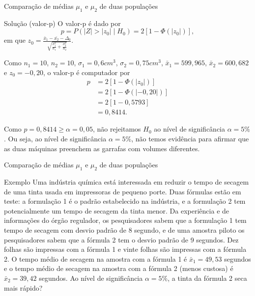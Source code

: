 \documentclass[9pt]{beamer}
\begin{document}
\begin{frame}{Comparação de médias $\mu_1$ e $\mu_2$ de duas populações}

\begin{block}{Solução (valor-p)}
	O valor-p é dado por
	$$p = P\left(\lvert Z \rvert > \lvert z_0 \rvert \mid H_0  \right) = 2 \left[ 1 - \Phi\left(\lvert z_0 \rvert\right) \right],$$
	em que $z_0 = \frac{\bar{x}_1 - \bar{x_2} - \Delta_0}{\sqrt{ \frac{\sigma_1^2}{n_1} + \frac{\sigma_2^2}{n_2} }}$.
	
	 Como $n_1=10$, $n_2=10$, $\sigma_1=0,6cm^3$, $\sigma_2=0,75cm^3$, $\bar{x}_1=599,965$, $\bar{x}_2=600,682 $ e $z_0=-0,20$, o valor-p é computador por
	 \begin{align*}
		 p &= 2 \left[1 -  \Phi\left(\lvert z_0 \rvert \right)\right]\\
		 &= 2 \left[ 1 - \Phi\left(\lvert -0,20 \rvert \right) \right]\\
		 &= 2 \left[ 1 - 0,5793 \right]\\
		 &= 0,8414.
	 \end{align*}
	 
	 Como $p=0,8414 \geq \alpha = 0,05$, não rejeitamos $H_0$ ao nível de significância $\alpha=5\%$. Ou seja, ao nível de significância $\alpha=5\%$, não temos evidência para afirmar que as duas máquinas preenchem as garrafas com volumes diferentes.
\end{block}

\end{frame}

\begin{frame}{Comparação de médias $\mu_1$ e $\mu_2$ de duas populações}

\begin{block}{Exemplo}
	Uma indústria química está interessada em reduzir o tempo de secagem de uma tinta usada em impressoras de pequeno porte. Duas fórmulas estão em teste: a formulação 1 é o padrão estabelecido na indústria, e a formulação 2 tem potencialmente um tempo de secagem da tinta menor. Da experiência e de informações do órgão regulador, os pesquisadores sabem que a formulação 1 tem tempo de secagem com desvio padrão de 8 segundo, e de uma amostra piloto os pesquisadores sabem que a fórmula 2 tem o desvio padrão de 9 segundos. Dez folhas são impressas com a fórmula 1 e vinte folhas são impressas com a fórmula 2. O tempo médio de secagem na amostra com a fórmula 1 é $\bar{x}_1 = 49,53$ segundos e o tempo médio de secagem na amostra com a fórmula 2 (menos custosa) é $\bar{x}_2 = 39,42$ segundos. Ao nível de significância $\alpha=5\%$, a tinta da fórmula 2 seca mais rápido?
\end{block}

\end{frame}
\end{document}
